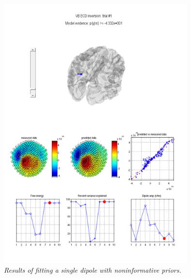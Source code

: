 \begin{figure}
\begin{center}
\includegraphics[width=100mm]{meg_sloc/Slide15}
\caption{\em Results of fitting a single dipole with noninformative priors.\label{meg_sloc:fig:15}}
\end{center}
\end{figure}


